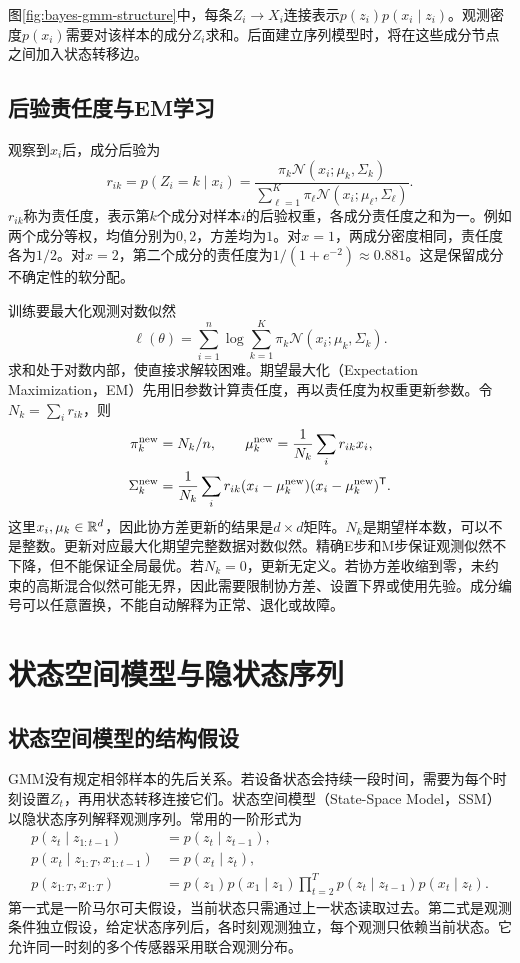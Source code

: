 图\ref{fig:bayes-gmm-structure}中，每条$Z_i\to X_i$连接表示$p(z_i)p(x_i\mid z_i)$。观测密度$p(x_i)$需要对该样本的成分$Z_i$求和。后面建立序列模型时，将在这些成分节点之间加入状态转移边。

\subsection{后验责任度与EM学习}
观察到$x_i$后，成分后验为
\begin{equation}
 r_{ik}=p(Z_i=k\mid x_i)
 =\frac{\pi_k\mathcal N(x_i;\mu_k,\Sigma_k)}
 {\sum_{\ell=1}^K\pi_\ell\mathcal N(x_i;\mu_\ell,\Sigma_\ell)}.
 \label{eq:bayes-gmm-responsibility}
\end{equation}
$r_{ik}$称为责任度，表示第$k$个成分对样本$i$的后验权重，各成分责任度之和为一。例如两个成分等权，均值分别为$0,2$，方差均为$1$。对$x=1$，两成分密度相同，责任度各为$1/2$。对$x=2$，第二个成分的责任度为$1/(1+e^{-2})\approx0.881$。这是保留成分不确定性的软分配。

训练要最大化观测对数似然
\begin{equation}
 \ell(\theta)=\sum_{i=1}^n\log\sum_{k=1}^K\pi_k\mathcal N(x_i;\mu_k,\Sigma_k).
\end{equation}
求和处于对数内部，使直接求解较困难。期望最大化（Expectation Maximization，EM）先用旧参数计算责任度，再以责任度为权重更新参数。令$N_k=\sum_i r_{ik}$，则
\begin{align}
 \pi_k^{\rm new}&=N_k/n,\qquad
 \mu_k^{\rm new}=\frac{1}{N_k}\sum_i r_{ik}x_i,\\
 \Sigma_k^{\rm new}&=\frac{1}{N_k}\sum_i r_{ik}
 (x_i-\mu_k^{\rm new})(x_i-\mu_k^{\rm new})^{\mathsf T}.
\end{align}
这里$x_i,\mu_k\in\mathbb{R}^d$，因此协方差更新的结果是$d\times d$矩阵。$N_k$是期望样本数，可以不是整数。更新对应最大化期望完整数据对数似然。精确E步和M步保证观测似然不下降，但不能保证全局最优。若$N_k=0$，更新无定义。若协方差收缩到零，未约束的高斯混合似然可能无界，因此需要限制协方差、设置下界或使用先验。成分编号可以任意置换，不能自动解释为正常、退化或故障。

\section{状态空间模型与隐状态序列}
\subsection{状态空间模型的结构假设}
GMM没有规定相邻样本的先后关系。若设备状态会持续一段时间，需要为每个时刻设置$Z_t$，再用状态转移连接它们。状态空间模型（State-Space Model，SSM）以隐状态序列解释观测序列。常用的一阶形式为
\begin{align}
 p(z_t\mid z_{1:t-1})&=p(z_t\mid z_{t-1}),\\
 p(x_t\mid z_{1:T},x_{1:t-1})&=p(x_t\mid z_t),\\
 p(z_{1:T},x_{1:T})&=p(z_1)p(x_1\mid z_1)
 \prod_{t=2}^T p(z_t\mid z_{t-1})p(x_t\mid z_t).
 \label{eq:bayes-ssm-joint}
\end{align}
第一式是一阶马尔可夫假设，当前状态只需通过上一状态读取过去。第二式是观测条件独立假设，给定状态序列后，各时刻观测独立，每个观测只依赖当前状态。它允许同一时刻的多个传感器采用联合观测分布。

